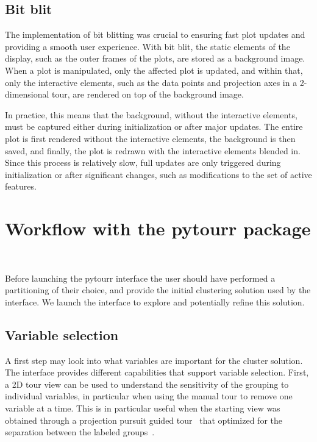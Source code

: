 \documentclass[article]{ajs}
\begin{document}
\subsection{Bit blit}

The implementation of bit blitting was crucial to ensuring fast plot updates and providing a smooth user experience. With bit blit, the static elements of the display, such as the outer frames of the plots, are stored as a background image. When a plot is manipulated, only the affected plot is updated, and within that, only the interactive elements, such as the data points and projection axes in a 2-dimensional tour, are rendered on top of the background image.

In practice, this means that the background, without the interactive elements, must be captured either during initialization or after major updates. The entire plot is first rendered without the interactive elements, the background is then saved, and finally, the plot is redrawn with the interactive elements blended in. Since this process is relatively slow, full updates are only triggered during initialization or after significant changes, such as modifications to the set of active features.

\section{Workflow with the pytourr package}~\label{workflow}

Before launching the pytourr interface the user should have performed a partitioning of their choice, and provide the initial clustering solution used by the interface. We launch the interface to explore and potentially refine this solution.

\subsection{Variable selection}

A first step may look into what variables are important for the cluster solution. The interface provides different capabilities that support variable selection. First, a 2D tour view can be used to understand the sensitivity of the grouping to individual variables, in particular when using the manual tour to remove one variable at a time. This is in particular useful when the starting view was obtained through a projection pursuit guided tour~\citep{CBCH94} that optimized for the separation between the labeled groups~\citep{lckl2005}.
\end{document}
